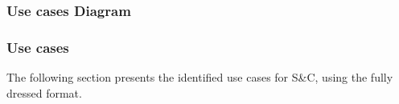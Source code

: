 



\subsubsection{Use cases Diagram}


\pagebreak

\subsubsection{Use cases}
The following section presents the identified use cases for S\&C, using the fully dressed format.


